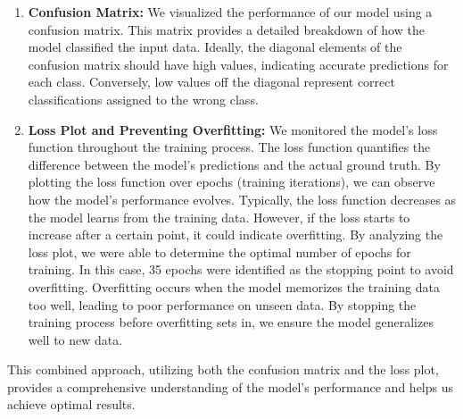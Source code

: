 \documentclass{article}
\begin{document}
\begin{enumerate}
\begin{enumerate}
    \item \textbf{Confusion Matrix:} We visualized the performance of our model using a confusion matrix. This matrix provides a detailed breakdown of how the model classified the input data. Ideally, the diagonal elements of the confusion matrix should have high values, indicating accurate predictions for each class. Conversely, low values off the diagonal represent correct classifications assigned to the wrong class.
    \item \textbf{Loss Plot and Preventing Overfitting:} We monitored the model's loss function throughout the training process. The loss function quantifies the difference between the model's predictions and the actual ground truth. By plotting the loss function over epochs (training iterations), we can observe how the model's performance evolves. Typically, the loss function decreases as the model learns from the training data. However, if the loss starts to increase after a certain point, it could indicate overfitting.
    By analyzing the loss plot, we were able to determine the optimal number of epochs for training. In this case, 35 epochs were identified as the stopping point to avoid overfitting. Overfitting occurs when the model memorizes the training data too well, leading to poor performance on unseen data. By stopping the training process before overfitting sets in, we ensure the model generalizes well to new data.

\end{enumerate}
This combined approach, utilizing both the confusion matrix and the loss plot, provides a comprehensive understanding of the model's performance and helps us achieve optimal results.


\end{enumerate}
\end{document}
